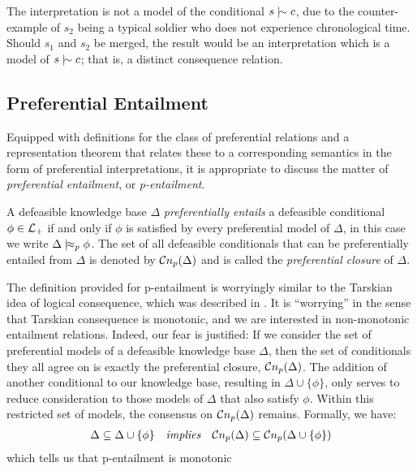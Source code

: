 The interpretation is not a model of the conditional $s \twiddle c$, due to the counter-example of $s_{2}$ being a
typical soldier who does not experience chronological time. Should $s_{1}$ and $s_{2}$ be merged, the result would be an
interpretation which is a model of $s\twiddle c$; that is, a distinct consequence relation.

\subsection{Preferential Entailment}
\label{subsection:preferential-entailment}

Equipped with definitions for the class of preferential relations and a representation theorem that relates these to a corresponding
semantics in the form of preferential interpretations, it is appropriate to discuss the matter of \textit{preferential
entailment}, or \textit{p-entailment}.

\begin{definition}
	\label{definition:p-entailment}

	A defeasible knowledge base $\Delta$ \textit{preferentially entails} a defeasible conditional $\phi \in \mathcal{L}_+$ if and only
	if $\phi$ is satisfied by every preferential model of $\Delta$, in this case we write $\Delta \mid\hskip-0.40ex\approx_{p}\phi$. The set
	of all defeasible conditionals that can be preferentially entailed from $\Delta$ is denoted by $\mathcal{C}n_{p}(\Delta)$ and is
	called the \textit{preferential closure} of $\Delta$.
\end{definition}

The definition provided for p-entailment is worryingly similar to the Tarskian idea of logical consequence, which was described
in . It is ``worrying'' in the sense that Tarskian consequence is monotonic, and we
are interested in non-monotonic entailment relations. Indeed, our fear is justified: If we consider the set of
preferential models of a defeasible knowledge base $\Delta$, then the set of conditionals they all agree on is exactly the
preferential closure, $\mathcal{C}n_{p}(\Delta)$. The addition of another conditional to our knowledge base, resulting in
$\Delta \cup \{\phi \}$, only serves to reduce consideration to those models of $\Delta$ that also satisfy $\phi$.
Within this restricted set of models, the consensus on $\mathcal{C}n_{p}(\Delta )$ remains. Formally, we have:
\begin{align}
	\Delta \subseteq \Delta \cup \{\phi\} \quad \textit{implies}\quad \mathcal{C}n_{p}(\Delta) \subseteq \mathcal{C}n_{p}(\Delta \cup \{ \phi \})
\end{align}
which tells us that p-entailment is monotonic

